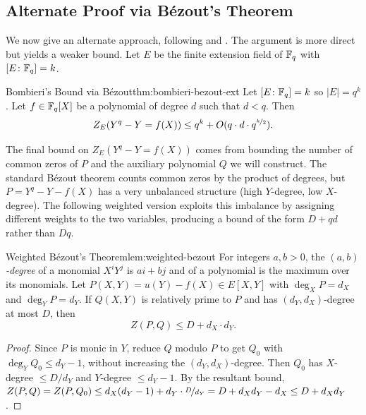 \subsection{Alternate Proof via B\'{e}zout's Theorem}

We now give an alternate approach, following \cite{Kopparty_2013_WeilBound} and \cite{Kumar_2024_PolynomialMethods}. The argument is more direct but yields a weaker bound. Let $E$ be the finite extension field of $\mathbb{F}_q$ with $[E\colon\mathbb{F}_q]=k$.
\begin{Theorem}{Bombieri's Bound via B\'{e}zout}{thm:bombieri-bezout-ext}
  Let $[E\colon\mathbb{F}_q]=k$ so $|E|=q^k$. Let $f\in \mathbb{F}_q[X]$ be a polynomial of degree $d$ such that $d<q$. Then $$Z_E(Y^q-Y=f(X))\leq q^k+O(q\cdot d\cdot q^{\nicefrac{k}2}).$$
\end{Theorem}

The final bound on $Z_E(Y^q-Y=f(X))$ comes from bounding the number of common zeros of $P$ and the auxiliary polynomial $Q$ we will construct. The standard B\'{e}zout theorem counts common zeros by the product of degrees, but $P = Y^q - Y - f(X)$ has a very unbalanced structure (high $Y$-degree, low $X$-degree). The following weighted version exploits this imbalance by assigning different weights to the two variables, producing a bound of the form $D + qd$ rather than $Dq$.
\begin{lemma}{Weighted B\'{e}zout's Theorem}{lem:weighted-bezout}
  For integers $a,b>0$, the \emph{$(a,b)$-degree} of a monomial $X^iY^j$ is $ai+bj$ and of a polynomial is the maximum over its monomials. Let $P(X,Y)=u(Y)-f(X)\in E[X,Y]$ with $\deg_X P=d_X$ and $\deg_Y P=d_Y$. If $Q(X,Y)$ is relatively prime to $P$ and has $(d_Y,d_X)$-degree at most $D$, then $$Z(P,Q)\leq D+d_X\cdot d_Y.$$
\end{lemma}
\begin{proof}
  Since $P$ is monic in $Y$, reduce $Q$ modulo $P$ to get $Q_0$ with $\deg_Y Q_0\leq d_Y-1$, without increasing the $(d_Y,d_X)$-degree. Then $Q_0$ has $X$-degree $\leq D/d_Y$ and $Y$-degree $\leq d_Y-1$. By the resultant bound, $Z(P,Q)=Z(P,Q_0)\leq d_X(d_Y-1)+d_Y\cdot\nicefrac{D}{d_Y}=D+d_Xd_Y-d_X\leq D+d_Xd_Y$.
\end{proof}

